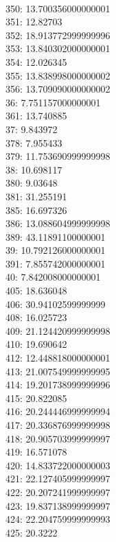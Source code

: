 \begin{multicols}{4}
  \\ 350: 13.700356000000001
  \\ 351: 12.82703
  \\ 352: 18.913772999999996
  \\ 353: 13.840302000000001
  \\ 354: 12.026345
  \\ 355: 13.838998000000002
  \\ 356: 13.709090000000002
  \\ 36: 7.751157000000001
  \\ 361: 13.740885
  \\ 37: 9.843972
  \\ 378: 7.955433
  \\ 379: 11.753690999999998
  \\ 38: 10.698117
  \\ 380: 9.03648
  \\ 381: 31.255191
  \\ 385: 16.697326
  \\ 386: 13.088604999999998
  \\ 389: 43.11891100000001
  \\ 39: 10.792126000000001
  \\ 391: 7.855742000000001
  \\ 40: 7.842008000000001
  \\ 405: 18.636048
  \\ 406: 30.94102599999999
  \\ 408: 16.025723
  \\ 409: 21.124420999999998
  \\ 410: 19.690642
  \\ 412: 12.448818000000001
  \\ 413: 21.007549999999995
  \\ 414: 19.201738999999996
  \\ 415: 20.822085
  \\ 416: 20.244446999999994
  \\ 417: 20.336876999999998
  \\ 418: 20.905703999999997
  \\ 419: 16.571078
  \\ 420: 14.833722000000003
  \\ 421: 22.127405999999997
  \\ 422: 20.207241999999997
  \\ 423: 19.837138999999997
  \\ 424: 22.204759999999993
  \\ 425: 20.3222

\end{multicols}
